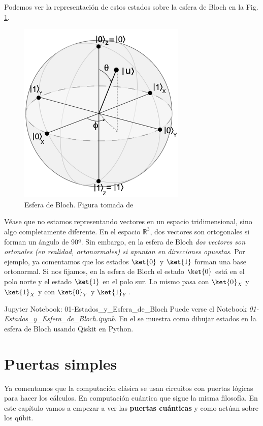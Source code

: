 \documentclass[a4paper,11pt]{book} %
\numberwithin{equation}{chapter}
\begin{document}
Podemos ver la representación de estos estados sobre la esfera de Bloch en la Fig. \ref{Fig_qubit_BlochSphere}. 




	\begin{figure}[H]
	\centering 
	\includegraphics[width=0.3\linewidth]{Figuras/Fig_qubit_BlochSphere.png}
	\caption{Esfera de Bloch. Figura tomada de \cite{bib_Curso-JMas}}
	\label{Fig_qubit_BlochSphere}
	\end{figure}
	
	Véase que no estamos representando vectores en un espacio tridimensional, sino algo completamente diferente. En el espacio $\mathbb{R}^3$, dos vectores son ortogonales si forman un ángulo de 90º. Sin embargo, en la esfera de Bloch \textit{dos vectores son ortonales (en realidad, ortonormales) si apuntan en direcciones opuestas}. Por ejemplo, ya comentamos que los estados $\ket{0}$ y $\ket{1}$ forman una base ortonormal. Si nos fijamos, en la esfera de Bloch el estado $\ket{0}$ está en el polo norte y el estado $\ket{1}$ en el polo sur. Lo mismo pasa con $\ket{0}_X$ y $\ket{1}_X$ y con $\ket{0}_Y$ y $\ket{1}_Y$.

        
    \begin{mybox_orange}{Jupyter Notebook: 01-Estados\_y\_Esfera\_de\_Bloch}
    Puede verse el Notebook \textit{01-Estados\_y\_Esfera\_de\_Bloch.ipynb}. En el se muestra como dibujar estados en la esfera de Bloch usando 
    Qiskit en Python.
    \end{mybox_orange}




\chapter{Puertas simples}

	Ya comentamos que la computación clásica se usan circuitos con puertas lógicas para hacer los cálculos. En computación cuántica que sigue la misma filosofía. En este capítulo vamos a empezar a ver las \textbf{puertas cuánticas} y como actúan sobre los qúbit.
	 
\end{document}
